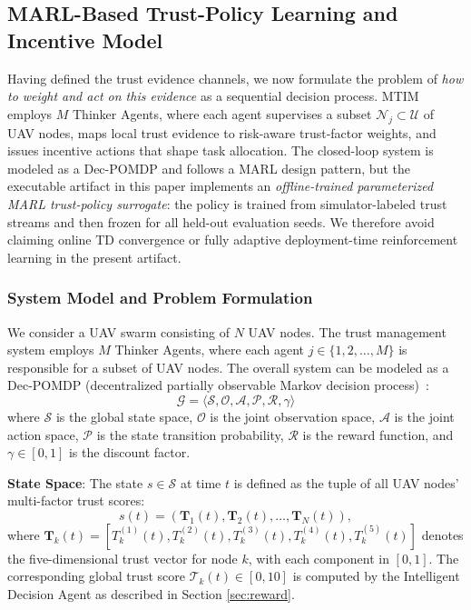 \documentclass[notspecified,article,submit,moreauthors]{Definitions/mdpi}
\begin{document}
\subsection{MARL-Based Trust-Policy Learning and Incentive Model}
\label{sec:marl_formulation}
Having defined the trust evidence channels, we now formulate the problem of \emph{how to weight and act on this evidence} as a sequential decision process. MTIM employs $M$ Thinker Agents, where each agent supervises a subset $\mathcal{N}_j \subset \mathcal{U}$ of UAV nodes, maps local trust evidence to risk-aware trust-factor weights, and issues incentive actions that shape task allocation. The closed-loop system is modeled as a Dec-POMDP and follows a MARL design pattern, but the executable artifact in this paper implements an \emph{offline-trained parameterized MARL trust-policy surrogate}: the policy is trained from simulator-labeled trust streams and then frozen for all held-out evaluation seeds. We therefore avoid claiming online TD convergence or fully adaptive deployment-time reinforcement learning in the present artifact.

\subsubsection{System Model and Problem Formulation}
We consider a UAV swarm consisting of $N$ UAV nodes. The trust management system employs $M$ Thinker Agents, where each agent $j \in \{1, 2, \dots, M\}$ is responsible for a subset of UAV nodes. The overall system can be modeled as a Dec-POMDP (decentralized partially observable Markov decision process)~\cite{oliehoek2008optimal}:
\begin{equation}
\mathcal{G} = \langle \mathcal{S}, \mathcal{O}, \mathcal{A}, \mathcal{P}, \mathcal{R}, \gamma \rangle
\end{equation}
where $\mathcal{S}$ is the global state space, $\mathcal{O}$ is the joint observation space, $\mathcal{A}$ is the joint action space, $\mathcal{P}$ is the state transition probability, $\mathcal{R}$ is the reward function, and $\gamma \in [0, 1]$ is the discount factor.

\textbf{State Space}: The state $s \in \mathcal{S}$ at time $t$ is defined as the tuple of all UAV nodes' multi-factor trust scores:
\[
s(t) = (\mathbf{T}_1(t), \mathbf{T}_2(t), \dots, \mathbf{T}_N(t)),
\]
where $\mathbf{T}_k(t) = [T_k^{(1)}(t), T_k^{(2)}(t), T_k^{(3)}(t), T_k^{(4)}(t), T_k^{(5)}(t)]$ denotes the five-dimensional trust vector for node $k$, with each component in $[0, 1]$. The corresponding global trust score $\mathcal{T}_k(t) \in [0, 10]$ is computed by the Intelligent Decision Agent as described in Section \ref{sec:reward}.
\end{document}
